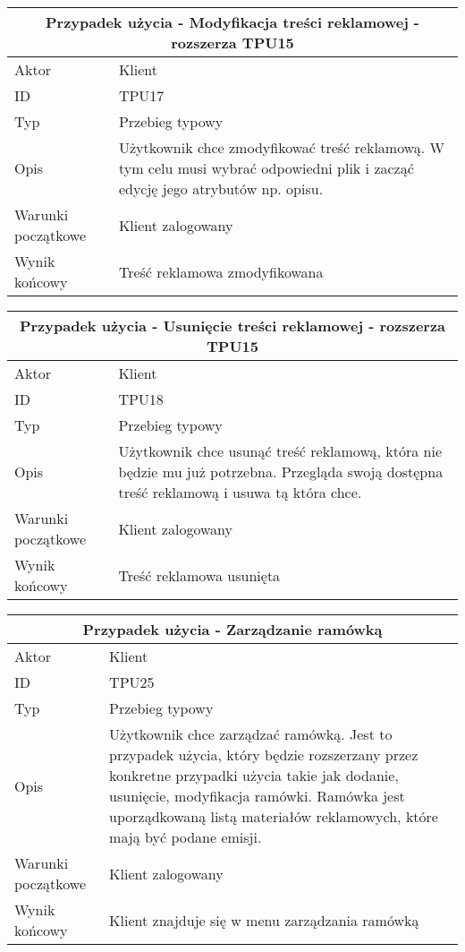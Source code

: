 \documentclass[10pt,a4paper,titlepage]{article} %
\begin{document}
		\begin {center}
		\begin{tabular}{|l|p{10cm}|}
		  \hline
		  \multicolumn{2}{|c|}{\bf Przypadek użycia - Modyfikacja treści
		  reklamowej - rozszerza TPU15}\\\hline
		  \hline
		  Aktor & Klient \\ \hline
		  ID & TPU17 \\ \hline
		  Typ & Przebieg typowy \\ \hline
		  Opis & Użytkownik chce zmodyfikować treść reklamową. W tym celu musi wybrać
		  odpowiedni plik i zacząć edycję jego atrybutów np. opisu.
		  \\
		  \hline Warunki początkowe & Klient zalogowany \\ \hline
		  Wynik końcowy & Treść reklamowa zmodyfikowana  \\
		  \hline
		\end{tabular}
		\end{center}
		
		\begin {center}
		\begin{tabular}{|l|p{10cm}|}
		  \hline
		  \multicolumn{2}{|c|}{\bf Przypadek użycia - Usunięcie treści
		  reklamowej - rozszerza TPU15}\\\hline
		  \hline
		  Aktor & Klient \\ \hline
		  ID & TPU18 \\ \hline
		  Typ & Przebieg typowy \\ \hline
		  Opis & Użytkownik chce usunąć treść reklamową, która nie będzie mu już
		  potrzebna. Przegląda swoją dostępna treść reklamową i usuwa tą która chce.
		  \\
		  \hline Warunki początkowe & Klient zalogowany \\ \hline
		  Wynik końcowy & Treść reklamowa usunięta  \\
		  \hline
		\end{tabular}
		\end{center}
		
		
		\begin {center}
		\begin{tabular}{|l|p{10cm}|}
		  \hline
		  \multicolumn{2}{|c|}{\bf Przypadek użycia - Zarządzanie ramówką}\\\hline
		  \hline
		  Aktor & Klient \\ \hline
		  ID & TPU25 \\ \hline
		  Typ & Przebieg typowy \\ \hline
		  Opis & Użytkownik chce zarządzać ramówką. Jest to przypadek
		  użycia, który będzie rozszerzany przez konkretne przypadki użycia takie jak
		  dodanie, usunięcie, modyfikacja ramówki. Ramówka jest uporządkowaną
		  listą materiałów reklamowych, które mają być podane emisji.
		  \\
		  \hline Warunki początkowe & Klient zalogowany \\ \hline
		  Wynik końcowy & Klient znajduje się w menu zarządzania ramówką  \\
		  \hline
		\end{tabular}
		\end{center}
		
\end{document}
